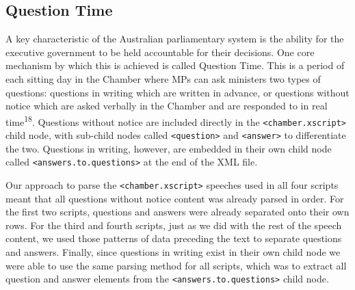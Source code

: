 \documentclass[
  letterpaper,
  DIV=11,
  numbers=noendperiod]{scrartcl}
\begin{document}
\hypertarget{sec-qa}{%
\subsection{Question Time}\label{sec-qa}}

A key characteristic of the Australian parliamentary system is the
ability for the executive government to be held accountable for their
decisions. One core mechanism by which this is achieved is called
Question Time. This is a period of each sitting day in the Chamber where
MPs can ask ministers two types of questions: questions in writing which
are written in advance, or questions without notice which are asked
verbally in the Chamber and are responded to in real
time\textsuperscript{18}. Questions without notice are included directly
in the \texttt{\textless{}chamber.xscript\textgreater{}} child node,
with sub-child nodes called \texttt{\textless{}question\textgreater{}}
and \texttt{\textless{}answer\textgreater{}} to differentiate the two.
Questions in writing, however, are embedded in their own child node
called \texttt{\textless{}answers.to.questions\textgreater{}} at the end
of the XML file.

Our approach to parse the
\texttt{\textless{}chamber.xscript\textgreater{}} speeches used in all
four scripts meant that all questions without notice content was already
parsed in order. For the first two scripts, questions and answers were
already separated onto their own rows. For the third and fourth scripts,
just as we did with the rest of the speech content, we used those
patterns of data preceding the text to separate questions and answers.
Finally, since questions in writing exist in their own child node we
were able to use the same parsing method for all scripts, which was to
extract all question and answer elements from the
\texttt{\textless{}answers.to.questions\textgreater{}} child node.
\end{document}
